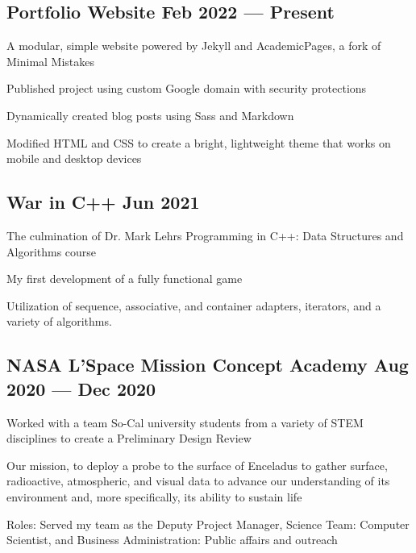 \documentclass[letter,10pt]{article}
\begin{document}
\subsection{{Portfolio Website \hfill Feb 2022 --- Present}}
\begin{zitemize}
\item A modular, simple website powered by Jekyll and AcademicPages, a fork of Minimal Mistakes
\item Published project using custom Google domain with security protections
\item Dynamically created blog posts using Sass and Markdown
\item Modified HTML and CSS to create a bright, lightweight theme that works on mobile and desktop devices
\end{zitemize}

\subsection{{War in C++ \hfill  Jun 2021}}
\begin{zitemize}
\item The culmination of Dr. Mark Lehrs Programming in C++: Data Structures and Algorithms course
\item My first development of a fully functional game
\item Utilization of sequence, associative, and container adapters, iterators, and a variety of algorithms. 
\end{zitemize}

\subsection{{NASA L'Space Mission Concept Academy \hfill Aug 2020 --- Dec 2020}}
\begin{zitemize}
\item Worked with a team So-Cal university students from a variety of STEM disciplines to create a Preliminary Design Review
\item Our mission, to deploy a probe to the surface of Enceladus to gather surface, radioactive, atmospheric, and visual data to advance our understanding of its environment and, more specifically, its ability to sustain life
\item Roles: Served my team as the Deputy Project Manager, Science Team: Computer Scientist, and Business Administration: Public affairs and outreach
\end{zitemize}
\end{document}
